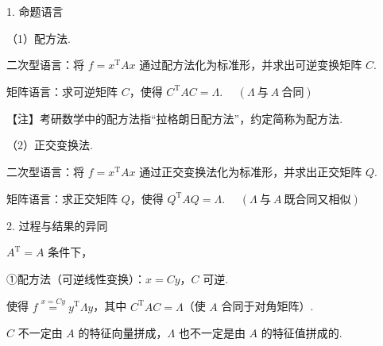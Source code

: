 



1. 命题语言

（1）配方法.

二次型语言：将 $f=x^{\mathrm T}Ax$ 通过配方法化为标准形，并求出可逆变换矩阵 $C$.


矩阵语言：求可逆矩阵 $C$，使得 $C^{\mathrm T}AC=\Lambda$. $\quad(\Lambda\ \text{与}\ A\ \text{合同})$


\begin{fnote}
【注】考研数学中的配方法指“拉格朗日配方法”，约定简称为配方法.
\end{fnote}

（2）正交变换法.

二次型语言：将 $f=x^{\mathrm T}Ax$ 通过正交变换法化为标准形，并求出正交矩阵 $Q$.


矩阵语言：求正交矩阵 $Q$，使得 $Q^{\mathrm T}AQ=\Lambda$. $\quad(\Lambda\ \text{与}\ A\ \text{既合同又相似})$


2. 过程与结果的异同


$A^{\mathrm T}=A$ 条件下，


①配方法（可逆线性变换）：$x=Cy$，$C$ 可逆.

使得 $f\overset{x=Cy}{=}y^{\mathrm T}\Lambda y$，其中 $C^{\mathrm T}AC=\Lambda$（使 $A$ 合同于对角矩阵）.

$C$ 不一定由 $A$ 的特征向量拼成，$\Lambda$ 也不一定是由 $A$ 的特征值拼成的.

